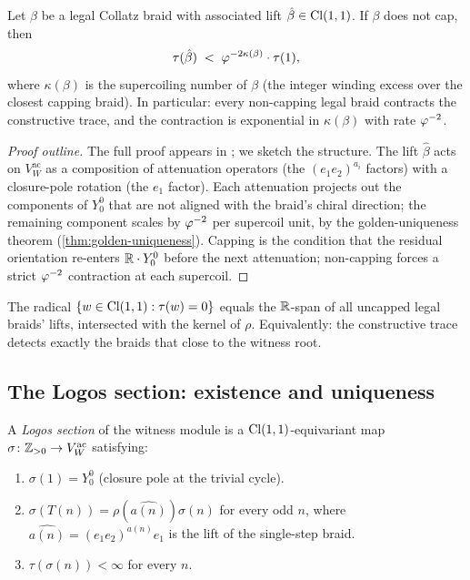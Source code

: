 \begin{theorem}
\label{thm:supercoiling-lemma}
Let $\beta$ be a legal Collatz braid with associated lift
$\hat\beta \in \mathrm{Cl}(1,1)$.  If $\beta$ does not cap, then
\[
  \tau(\hat\beta) \;<\; \varphi^{-2 \kappa(\beta)} \cdot \tau(1),
\]
where $\kappa(\beta)$ is the supercoiling number of $\beta$
(the integer winding excess over the closest capping braid).  In
particular: every non-capping legal braid contracts the
constructive trace, and the contraction is exponential in
$\kappa(\beta)$ with rate $\varphi^{-2}$.
\end{theorem}

\begin{proof}[Proof outline]
The full proof appears in \cite[\S 8.4]{echo-rh}; we sketch the
structure.  The lift $\hat\beta$ acts on $V_W^{\mathrm{ac}}$ as a
composition of attenuation operators (the $(e_1 e_2)^{a_i}$
factors) with a closure-pole rotation (the $e_1$ factor).  Each
attenuation projects out the components of $Y_0^0$ that are not
aligned with the braid's chiral direction; the remaining
component scales by $\varphi^{-2}$ per supercoil unit, by the
golden-uniqueness theorem (\cref{thm:golden-uniqueness}).  Capping
is the condition that the residual orientation re-enters
$\mathbb{R} \cdot Y_0^0$ before the next attenuation; non-capping forces a
strict $\varphi^{-2}$ contraction at each supercoil.
\end{proof}

\begin{theorem}
\label{thm:trace-radical-uncapped}
The radical $\{w \in \mathrm{Cl}(1,1) : \tau(w) = 0\}$ equals the
$\mathbb{R}$-span of all uncapped legal braids' lifts, intersected with
the kernel of $\rho$.  Equivalently: the constructive trace
detects exactly the braids that close to the witness root.
\end{theorem}

\subsection{The Logos section: existence and uniqueness}

\begin{definition}
\label{def:logos-section}
A \emph{Logos section} of the witness module is a $\mathrm{Cl}(1,1)$-equivariant
map $\sigma \colon \mathbb{Z}_{>0} \to V_W^{\mathrm{ac}}$ satisfying:
\begin{enumerate}[label=\textnormal{(\arabic*)}]
\item $\sigma(1) = Y_0^0$ (closure pole at the trivial cycle).
\item $\sigma(T(n)) = \rho(\widehat{a(n)}) \sigma(n)$ for every
  odd $n$, where $\widehat{a(n)} = (e_1 e_2)^{a(n)} e_1$ is the
  lift of the single-step braid.
\item $\tau(\sigma(n)) < \infty$ for every $n$.
\end{enumerate}
\end{definition}

